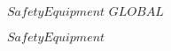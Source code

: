 \kClass $SafetyEquipment$ \kISO $GLOBAL$
\par
\kInstanceVarDef
\parlinebr
\begin{insvar}
\end{insvar}
\par
\kEnd $SafetyEquipment$

